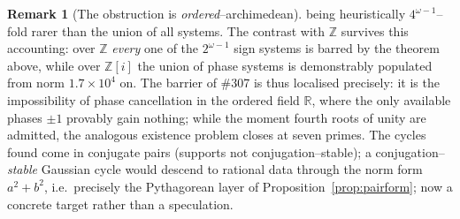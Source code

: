 \documentclass[11pt]{article}
\theoremstyle{definition}
\newtheorem{remark}[theorem]{Remark}
\begin{document}
\begin{remark}[The obstruction is \emph{ordered}--archimedean]
being heuristically $4^{\omega-1}$--fold rarer than the union of all systems. The contrast with
$\mathbb{Z}$ survives this accounting: over $\mathbb{Z}$ \emph{every} one of the $2^{\omega-1}$ sign
systems is barred by the theorem above, while over $\mathbb{Z}[i]$ the union of phase systems is
demonstrably populated from norm $1.7\times10^4$ on. The barrier of \#307 is thus localised precisely: it is the impossibility of phase
cancellation in the ordered field $\mathbb{R}$, where the only available phases $\pm1$ provably gain
nothing; while the moment fourth roots of unity are admitted, the analogous existence problem closes
at seven primes. The cycles found come in conjugate pairs (supports not conjugation--stable); a
conjugation--\emph{stable} Gaussian cycle would descend to rational data through the norm form
$a^2+b^2$, i.e.\ precisely the Pythagorean layer of Proposition~\ref{prop:pairform}; now a concrete
target rather than a speculation.
\end{remark}
\end{document}
